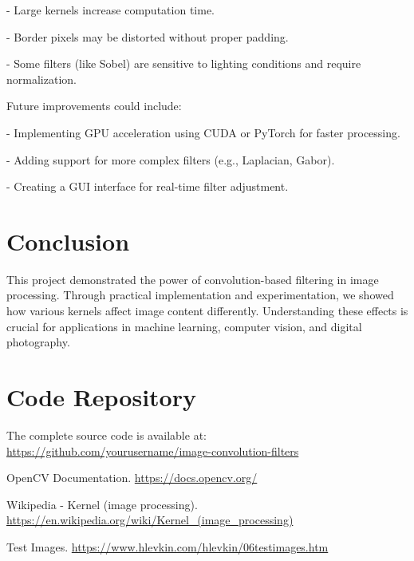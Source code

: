 \documentclass[12pt,a4paper]{article}
\begin{document}
	
	- Large kernels increase computation time.
	
	- Border pixels may be distorted without proper padding.
	
	- Some filters (like Sobel) are sensitive to lighting conditions and require normalization.
	
	
	Future improvements could include:
	
	
	- Implementing GPU acceleration using CUDA or PyTorch for faster processing.
	
	- Adding support for more complex filters (e.g., Laplacian, Gabor).
	
	- Creating a GUI interface for real-time filter adjustment.
	
	
	\section{Conclusion}
	This project demonstrated the power of convolution-based filtering in image processing. Through practical implementation and experimentation, we showed how various kernels affect image content differently. Understanding these effects is crucial for applications in machine learning, computer vision, and digital photography.
	
	\section*{Code Repository}
	The complete source code is available at: \url{https://github.com/yourusername/image-convolution-filters} 
	
	
	\begin{thebibliography}{9}
		OpenCV Documentation. \url{https://docs.opencv.org/} 
		
		Wikipedia - Kernel (image processing). \url{https://en.wikipedia.org/wiki/Kernel_(image_processing)} 
		
		Test Images. \url{https://www.hlevkin.com/hlevkin/06testimages.htm} 
	\end{thebibliography}
	
\end{document}

